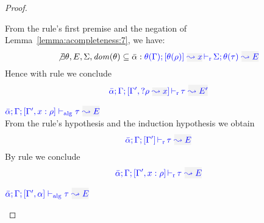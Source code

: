 \begin{proof}
\begin{description}
From the rule's first premise and the negation of Lemma~\ref{lemma:acompleteness:7}, we have:
\begin{equation*}
\not\exists \theta, E, \Sigma, \dom(\theta) \subseteq \bar{\alpha}:
\dmres{\theta(\tenv)}{\theta(\rulet)}{x}{\theta(\type)}{E}{\Sigma}
\end{equation*}
  Hence with rule  we conclude
\begin{equation*}
   \dlres{\bar\alpha}{\tenv}{\tenv',\envi{\rulet}{x}}{\type}{E'}
\end{equation*}

\item[\fbox{\rref{Alg-L-Var}}]\quad
$\adlres{\bar\alpha}{\tenv}{\tenv',\relation{x}{\rulet}}{\type}{E}$\ \\

From the rule's hypothesis and the induction hypothesis we obtain
\begin{equation*}
  \dlres{\bar\alpha}{\tenv}{\tenv'}{\type}{E}
\end{equation*}
By rule  we conclude
\begin{equation*}
  \dlres{\bar\alpha}{\tenv}{\tenv',\relation{x}{\rulet}}{\type}{E}
\end{equation*}

\item[\fbox{\rref{Alg-L-TyVar}}]\quad
$\adlres{\bar{\alpha}}{\tenv}{\tenv',\alpha}{\type}{E}$ \ \\


\end{description}
\end{proof}
